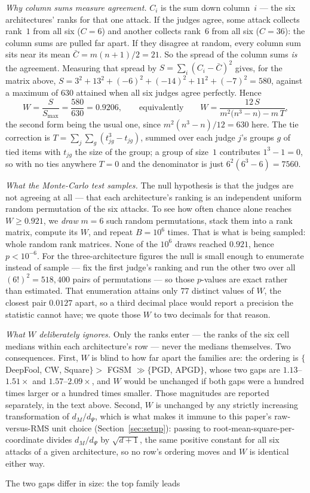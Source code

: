 \begin{clarifybox}
\emph{Why column sums measure agreement.} $C_i$ is the sum down column~$i$ ---
the six architectures' ranks for that one attack. If the judges agree, some
attack collects rank~$1$ from all six ($C=6$) and another collects rank~$6$ from
all six ($C=36$): the column sums are pulled far apart. If they disagree at
random, every column sum sits near its mean $\bar C=m(n{+}1)/2=21$. So the
spread of the column sums \emph{is} the agreement. Measuring that spread by
$S=\sum_i(C_i-\bar C)^2$ gives, for the matrix above,
$S=3^2+13^2+(-6)^2+(-14)^2+11^2+(-7)^2=580$, against a maximum of $630$ attained
when all six judges agree perfectly. Hence
\[
W=\frac{S}{S_{\max}}=\frac{580}{630}=0.9206,
\qquad\text{equivalently}\qquad
W=\frac{12\,S}{m^{2}\bigl(n^{3}-n\bigr)-m\,T},
\]
the second form being the usual one, since $m^{2}(n^{3}-n)/12=630$ here. The
tie correction is $T=\sum_{j}\sum_{g}(t_{jg}^{3}-t_{jg})$, summed over each
judge $j$'s groups $g$ of tied items with $t_{jg}$ the size of the group; a
group of size~$1$ contributes $1^3-1=0$, so with no ties anywhere $T=0$ and the
denominator is just $6^2(6^3-6)=7560$.

\emph{What the Monte-Carlo test samples.} The null hypothesis is that the judges
are not agreeing at all --- that each architecture's ranking is an independent
uniform random permutation of the six attacks. To see how often chance alone
reaches $W\ge0.921$, we \emph{draw} $m=6$ such random permutations, stack them
into a rank matrix, compute its $W$, and repeat $B=10^{6}$ times. That is what
is being sampled: whole random rank matrices. None of the $10^{6}$ draws reached
$0.921$, hence $p<10^{-6}$. For the three-architecture figures the null is small
enough to enumerate instead of sample --- fix the first judge's ranking and run
the other two over all $(6!)^2=518{,}400$ pairs of permutations --- so those
$p$-values are exact rather than estimated. That enumeration attains only $77$
distinct values of $W$, the closest pair $0.0127$ apart, so a third decimal
place would report a precision the statistic cannot have; we quote those $W$ to
two decimals for that reason.

\emph{What $W$ deliberately ignores.} Only the ranks enter --- the ranks of the
six cell medians within each architecture's row --- never the medians
themselves. Two consequences. First, $W$ is blind to how far apart the families
are: the ordering is $\{$DeepFool, CW, Square$\}>$ FGSM $\gg\{$PGD, APGD$\}$,
whose two gaps are $1.13$--$1.51\times$ and $1.57$--$2.09\times$, and $W$ would
be unchanged if both gaps were a hundred times larger or a hundred times
smaller. Those magnitudes are reported separately, in the text above. Second,
$W$ is unchanged by any strictly increasing transformation of $d_M/d_\Psi$, which
is what makes it immune to this paper's raw-versus-RMS unit choice
(Section~\ref{sec:setup}): passing to root-mean-square-per-coordinate divides
$d_M/d_\Psi$ by $\sqrt{d{+}1}$, the same positive constant for all six attacks of a
given architecture, so no row's ordering moves and $W$ is identical either way.
\end{clarifybox} The two gaps differ in size: the top family leads
